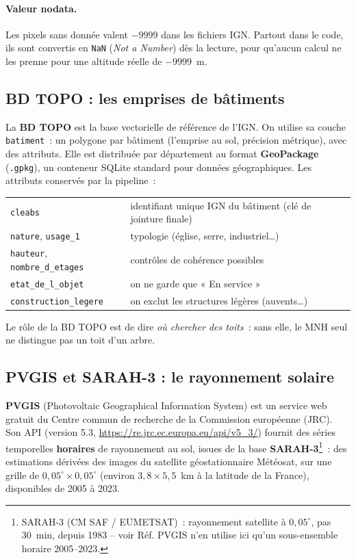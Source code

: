 \documentclass[11pt,a4paper]{article}
\newcommand{\fichier}[1]{\texttt{#1}}
\newcommand{\fonction}[1]{\texttt{#1}}
\begin{document}
\paragraph{Valeur nodata.} Les pixels sans donnée valent $-9999$ dans les
fichiers IGN. Partout dans le code, ils sont convertis en \fonction{NaN}
(\emph{Not a Number}) dès la lecture, pour qu'aucun calcul ne les prenne pour
une altitude réelle de $-9999$~m.

\subsection{BD TOPO : les emprises de bâtiments}

La \textbf{BD TOPO} est la base vectorielle de référence de l'IGN. On utilise sa
couche \fichier{batiment}~: un polygone par bâtiment (l'emprise au sol, précision
métrique), avec des attributs. Elle est distribuée par département au format
\textbf{GeoPackage} (\fichier{.gpkg}), un conteneur SQLite standard pour données
géographiques. Les attributs conservés par la pipeline~:

\begin{center}
\begin{tabular}{ll}
\toprule
\fichier{cleabs} & identifiant unique IGN du bâtiment (clé de jointure finale)\\
\fichier{nature}, \fichier{usage\_1} & typologie (église, serre, industriel\ldots)\\
\fichier{hauteur}, \fichier{nombre\_d\_etages} & contrôles de cohérence possibles\\
\fichier{etat\_de\_l\_objet} & on ne garde que « En service »\\
\fichier{construction\_legere} & on exclut les structures légères (auvents\ldots)\\
\bottomrule
\end{tabular}
\end{center}

Le rôle de la BD TOPO est de dire \emph{où chercher des toits}~: sans elle, le
MNH seul ne distingue pas un toit d'un arbre.

\subsection{PVGIS et SARAH-3 : le rayonnement solaire}
\label{sec:pvgis}

\textbf{PVGIS} (Photovoltaic Geographical Information System) est un service web
gratuit du Centre commun de recherche de la Commission européenne (JRC). Son API
(version 5.3, \url{https://re.jrc.ec.europa.eu/api/v5_3/}) fournit des
séries temporelles \textbf{horaires} de rayonnement au sol, issues de la base
\textbf{SARAH-3}\footnote{SARAH-3 (CM SAF / EUMETSAT)~: rayonnement satellite à
$0{,}05^\circ$, pas 30~min, depuis 1983 -- voir Réf. PVGIS n'en utilise ici qu'un
sous-ensemble horaire 2005--2023.}~: des estimations dérivées des images du
satellite géostationnaire Météosat, sur une grille de
$0{,}05^\circ \times 0{,}05^\circ$ (environ $3{,}8 \times 5{,}5$~km à la latitude
de la France), disponibles de 2005 à 2023.
\end{document}
